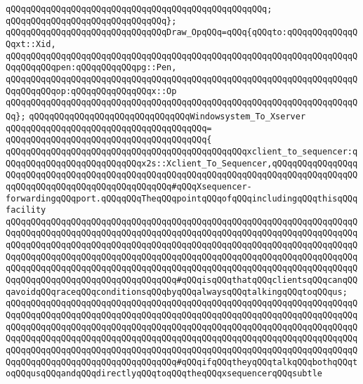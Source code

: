 \verb|qQQqqQQqqQQqqQQqqQQqqQQqqQQqqQQqqQQqqQQqqQQqqQQqqQQq;|\newline
\verb|qQQqqQQqqQQqqQQqqQQqqQQqqQQqqQQq};|\newline
\newline
\verb|qQQqqQQqqQQqqQQqqQQqqQQqqQQqqQQqDraw_OpqQQq=qQQq{qQQqto:qQQqqQQqqQQqqQQqxt::Xid,|\newline
\verb|qQQqqQQqqQQqqQQqqQQqqQQqqQQqqQQqqQQqqQQqqQQqqQQqqQQqqQQqqQQqqQQqqQQqqQQqqQQqqQQqpen:qQQqqQQqqQQqpg::Pen,|\newline
\verb|qQQqqQQqqQQqqQQqqQQqqQQqqQQqqQQqqQQqqQQqqQQqqQQqqQQqqQQqqQQqqQQqqQQqqQQqqQQqqQQqop:qQQqqQQqqQQqqQQqx::Op|\newline
\verb|qQQqqQQqqQQqqQQqqQQqqQQqqQQqqQQqqQQqqQQqqQQqqQQqqQQqqQQqqQQqqQQqqQQqqQQq};|\newline
\newline
\verb|qQQqqQQqqQQqqQQqqQQqqQQqqQQqqQQqWindowsystem_To_Xserver|\newline
\verb|qQQqqQQqqQQqqQQqqQQqqQQqqQQqqQQqqQQqqQQq=|\newline
\verb|qQQqqQQqqQQqqQQqqQQqqQQqqQQqqQQqqQQqqQQq{|\newline
\verb|qQQqqQQqqQQqqQQqqQQqqQQqqQQqqQQqqQQqqQQqqQQqqQQqxclient_to_sequencer:qQQqqQQqqQQqqQQqqQQqqQQqqQQqx2s::Xclient_To_Sequencer,qQQqqQQqqQQqqQQqqQQqqQQqqQQqqQQqqQQqqQQqqQQqqQQqqQQqqQQqqQQqqQQqqQQqqQQqqQQqqQQqqQQqqQQqqQQqqQQqqQQqqQQqqQQqqQQqqQQqqQQq#qQQqXsequencer-forwardingqQQqport.qQQqqQQqTheqQQqpointqQQqofqQQqincludingqQQqthisqQQqfacility|\newline
\verb|qQQqqQQqqQQqqQQqqQQqqQQqqQQqqQQqqQQqqQQqqQQqqQQqqQQqqQQqqQQqqQQqqQQqqQQqqQQqqQQqqQQqqQQqqQQqqQQqqQQqqQQqqQQqqQQqqQQqqQQqqQQqqQQqqQQqqQQqqQQqqQQqqQQqqQQqqQQqqQQqqQQqqQQqqQQqqQQqqQQqqQQqqQQqqQQqqQQqqQQqqQQqqQQqqQQqqQQqqQQqqQQqqQQqqQQqqQQqqQQqqQQqqQQqqQQqqQQqqQQqqQQqqQQqqQQqqQQqqQQqqQQqqQQqqQQqqQQqqQQqqQQqqQQqqQQqqQQqqQQqqQQqqQQqqQQqqQQqqQQqqQQqqQQqqQQqqQQqqQQqqQQqqQQqqQQqqQQqqQQqqQQq#qQQqisqQQqthatqQQqclientsqQQqcanqQQqavoidqQQqraceqQQqconditionsqQQqbyqQQqalwaysqQQqtalkingqQQqtoqQQqus;|\newline
\verb|qQQqqQQqqQQqqQQqqQQqqQQqqQQqqQQqqQQqqQQqqQQqqQQqqQQqqQQqqQQqqQQqqQQqqQQqqQQqqQQqqQQqqQQqqQQqqQQqqQQqqQQqqQQqqQQqqQQqqQQqqQQqqQQqqQQqqQQqqQQqqQQqqQQqqQQqqQQqqQQqqQQqqQQqqQQqqQQqqQQqqQQqqQQqqQQqqQQqqQQqqQQqqQQqqQQqqQQqqQQqqQQqqQQqqQQqqQQqqQQqqQQqqQQqqQQqqQQqqQQqqQQqqQQqqQQqqQQqqQQqqQQqqQQqqQQqqQQqqQQqqQQqqQQqqQQqqQQqqQQqqQQqqQQqqQQqqQQqqQQqqQQqqQQqqQQqqQQqqQQqqQQqqQQqqQQqqQQqqQQqqQQq#qQQqifqQQqtheyqQQqtalkqQQqbothqQQqtoqQQqusqQQqandqQQqdirectlyqQQqtoqQQqtheqQQqxsequencerqQQqsubtle|\newline

